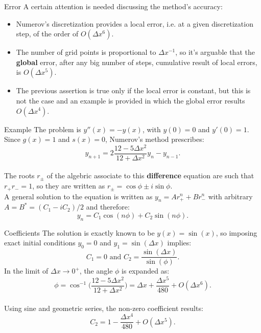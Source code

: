 \documentclass{beamer}
\begin{document}
\begin{frame}{Error}
A certain attention is needed discussing the method's accuracy:\\
\vspace{\baselineskip}
\begin{itemize}
\item Numerov's discretization provides a local error, i.e. at a given discretization step, of the order of $O(\Delta x^6)$.\\
\vspace{\baselineskip}
\item The number of grid points is proportional to $\Delta x^{-1}$, so it's arguable that the \textbf{global} error, after any big number of steps, cumulative result of local errors, is $O(\Delta x^5)$.
\vspace{\baselineskip}
\item The previous assertion is true only if the local error is constant, but this is not the case and an example is provided in which the global error results $O(\Delta x^4)$.
\end{itemize}
\end{frame}

\begin{frame}{Example}
The problem is $y''(x)=-y(x)$, with $y(0)=0$ and $y'(0)=1$. Since $g(x)=1$ and $s(x)=0$, Numerov's method prescribes:
\vspace{0.5em}
$$y_{n+1}=2\frac{12-5\Delta x^2}{12+\Delta x^2}y_n-y_{n-1}.$$\\\vspace{0.5em}
The roots $r_{\pm}$ of the algebric associate to this \textbf{difference} equation are such that $r_+r_-=1$, so they are written as $r_{\pm}=\cos\phi\pm i\sin\phi$.\\
\vspace{\baselineskip}
A general solution to the equation is written as $y_n=Ar_+^n+Br_-^n$ with arbitrary $A=B^*=(C_1-iC_2)/2$ and therefore:
\vspace{0.5em}
$$y_n=C_1\cos(n\phi)+C_2\sin(n\phi).$$
\end{frame}

\begin{frame}{Coefficients}
The solution is exactly known to be $y(x)=\sin(x)$, so imposing exact initial conditions $y_0=0$ and $y_1=\sin(\Delta x)$ implies:
$$C_1=0\text{ and }C_2=\frac{\sin(\Delta x)}{\sin(\phi)}.$$
In the limit of $\Delta x\to 0^{+}$, the angle $\phi$ is expanded as:
$$\phi=\cos^{-1}\bigg(\frac{12-5\Delta x^2}{12+\Delta x^2}\bigg)=\Delta x+\frac{\Delta x^5}{480}+O(\Delta x^6).$$\\
Using sine and geometric series, the non-zero coefficient results:
$$C_2=1-\frac{\Delta x^4}{480}+O(\Delta x^5).$$
\end{frame}
\end{document}
